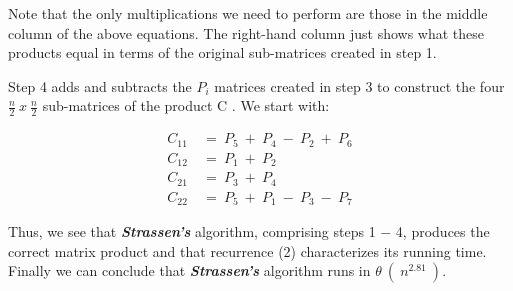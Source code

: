 Note that the only multiplications we need to perform are those in the middle column of the above equations. The right-hand column just shows what these products equal in terms of the original sub-matrices created in step 1. \hfill \break

Step 4 adds and subtracts the $P_{i}$ matrices created in step 3 to construct the four $\frac{n}{2}\ x\ \frac{n}{2}$ sub-matrices of the product C . We start with: \hfill \break

\begin{ceqn}
\begin{align*}
C_{11}\ &=\ P_{5}\ +\ P_{4}\ -\ P_{2}\ +\ P_{6} \\
C_{12}\ &=\ P_{1}\ +\ P_{2} \\
C_{21}\ &=\ P_{3}\ +\ P_{4} \\
C_{22}\ &=\ P_{5}\ +\ P_{1}\ -\ P_{3}\ -\ P_{7}
\end{align*}
\end{ceqn} \hfill

Thus, we see that {\bfseries\itshape Strassen's} algorithm, comprising steps 1 $-$ 4, produces the correct matrix product and that recurrence (2) characterizes its running time. Finally we can conclude that {\bfseries\itshape Strassen's} algorithm runs in $\theta\ (\ n^{2.81}\ )$.

\pagebreak